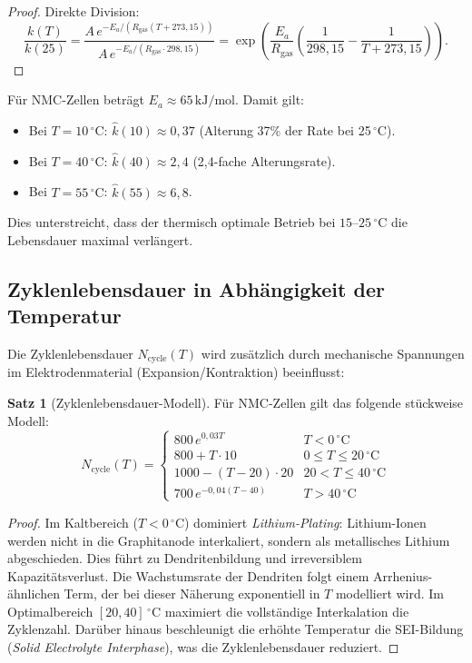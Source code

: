 ﻿\documentclass[a4paper,12pt]{article}
\theoremstyle{definition}
\newtheorem{satz}{Satz}
\begin{document}
\begin{proof}
Direkte Division:
\[
  \frac{k(T)}{k(25)} = \frac{A\,e^{-E_a/(R_\mathrm{gas}(T+273{,}15))}}{A\,e^{-E_a/(R_\mathrm{gas}\cdot 298{,}15)}} = \exp\!\left(\frac{E_a}{R_\mathrm{gas}}\left(\frac{1}{298{,}15} - \frac{1}{T+273{,}15}\right)\right).
\]
\end{proof}

F\"ur NMC-Zellen betr\"agt $E_a \approx 65\,\mathrm{kJ/mol}$. Damit gilt:
\begin{itemize}
  \item Bei $T = 10\,{}^\circ\mathrm{C}$: $\hat{k}(10) \approx 0{,}37$ (Alterung 37\% der Rate bei 25\,${}^\circ$C).
  \item Bei $T = 40\,{}^\circ\mathrm{C}$: $\hat{k}(40) \approx 2{,}4$ (2,4-fache Alterungsrate).
  \item Bei $T = 55\,{}^\circ\mathrm{C}$: $\hat{k}(55) \approx 6{,}8$.
\end{itemize}

Dies unterstreicht, dass der thermisch optimale Betrieb bei $15$--$25\,{}^\circ\mathrm{C}$ die Lebensdauer maximal verl\"angert.

\subsection{Zyklenlebensdauer in Abh\"angigkeit der Temperatur}

Die Zyklenlebensdauer $N_\mathrm{cycle}(T)$ wird zus\"atzlich durch mechanische Spannungen im Elektrodenmaterial (Expansion/Kontraktion) beeinflusst:

\begin{satz}[Zyklenlebensdauer-Modell]
\label{satz:zyklen}
F\"ur NMC-Zellen gilt das folgende st\"uckweise Modell:
\[
  N_\mathrm{cycle}(T) = \begin{cases}
    800\,e^{0{,}03 T} & T < 0\,{}^\circ\mathrm{C} \\
    800 + T \cdot 10 & 0 \leq T \leq 20\,{}^\circ\mathrm{C} \\
    1000 - (T - 20) \cdot 20 & 20 < T \leq 40\,{}^\circ\mathrm{C} \\
    700\,e^{-0{,}04(T-40)} & T > 40\,{}^\circ\mathrm{C}
  \end{cases}
\]
\end{satz}

\begin{proof}
Im Kaltbereich ($T < 0\,{}^\circ\mathrm{C}$) dominiert \emph{Lithium-Plating}: Lithium-Ionen werden nicht in die Graphitanode interkaliert, sondern als metallisches Lithium abgeschieden. Dies f\"uhrt zu Dendritenbildung und irreversiblem Kapazit\"atsverlust. Die Wachstumsrate der Dendriten folgt einem Arrhenius-\"ahnlichen Term, der bei dieser N\"aherung exponentiell in $T$ modelliert wird. Im Optimalbereich $[20, 40]\,{}^\circ\mathrm{C}$ maximiert die vollst\"andige Interkalation die Zyklenzahl. Dar\"uber hinaus beschleunigt die erh\"ohte Temperatur die SEI-Bildung (\emph{Solid Electrolyte Interphase}), was die Zyklenlebensdauer reduziert.
\end{proof}
\end{document}
